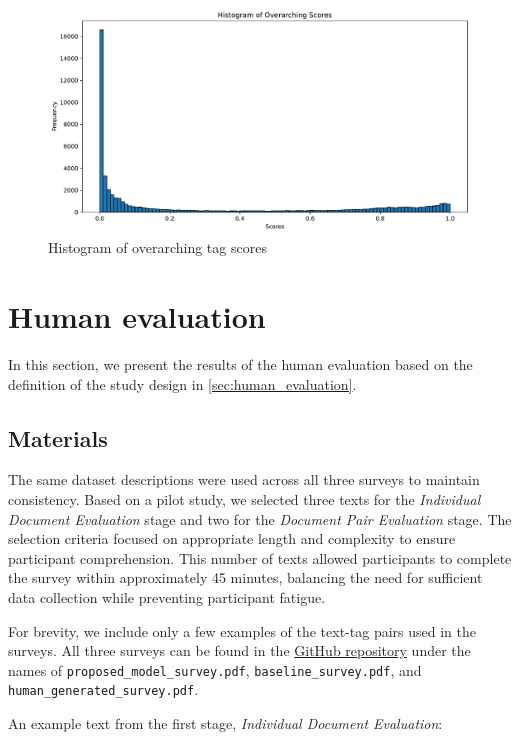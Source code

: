 \begin{figure}[h]
    \centering
    \includegraphics[width=\textwidth]{figures/histogram_overarching_scores.pdf}
    \caption{Histogram of overarching tag scores}
    \label{fig:histogram_overarching_scores}
\end{figure}

\section{Human evaluation}
In this section, we present the results of the human evaluation based on the definition of the study design in \cref{sec:human_evaluation}.

\subsection{Materials}
The same dataset descriptions were used across all three surveys to maintain consistency. Based on a pilot study, we selected three texts for the \textit{Individual Document Evaluation} stage and two for the \textit{Document Pair Evaluation} stage. The selection criteria focused on appropriate length and complexity to ensure participant comprehension. This number of texts allowed participants to complete the survey within approximately 45 minutes, balancing the need for sufficient data collection while preventing participant fatigue.

For brevity, we include only a few examples of the text-tag pairs used in the surveys. All three surveys can be found in the \href{https://github.com/ivangermanov/openml-tags}{GitHub repository} \cite{germanov_topic_modeling_of_2024} under the names of \texttt{proposed\_model\_survey.pdf}, \texttt{baseline\_survey.pdf}, and \texttt{human\_generated\_survey.pdf}.

An example text from the first stage, \textit{Individual Document Evaluation}:

